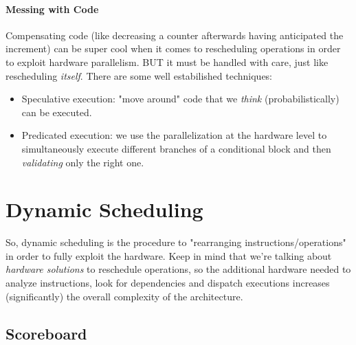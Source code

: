 \documentclass[10pt,a4paper]{article}
\begin{document}
					\paragraph{Messing with Code}
						Compensating code (like decreasing a counter afterwards having anticipated the increment) can be super cool when it comes to rescheduling operations in order to exploit hardware parallelism. BUT it must be handled with care, just like rescheduling \emph{itself}. There are some well estabilished techniques:
						\begin{itemize}
							\item Speculative execution: "move around" code that we \emph{think} (probabilistically) can be executed.
							\item Predicated execution: we use the parallelization at the hardware level to simultaneously execute different branches of a conditional block and then \emph{validating} only the right one.
						\end{itemize}
						
		\section{Dynamic Scheduling}
			So, dynamic scheduling is the procedure to "rearranging instructions/operations" in order to fully exploit the hardware. Keep in mind that we're talking about \emph{hardware solutions} to reschedule operations, so the additional hardware needed to analyze instructions, look for dependencies and dispatch executions increases (significantly) the overall complexity of the architecture.
			
			\subsection{Scoreboard}
\end{document}
